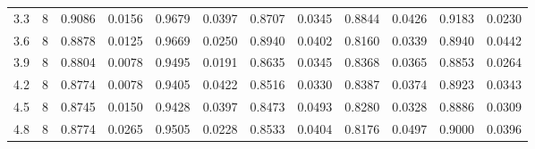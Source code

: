 \begin{tabular}{rrrrrrrrrrrr}
       3.3 &     8 &   0.9086 & 0.0156 &               0.9679 & 0.0397 &                   0.8707 & 0.0345 &               0.8844 & 0.0426 &                       0.9183 & 0.0230 \\
       3.6 &     8 &   0.8878 & 0.0125 &               0.9669 & 0.0250 &                   0.8940 & 0.0402 &               0.8160 & 0.0339 &                       0.8940 & 0.0442 \\
       3.9 &     8 &   0.8804 & 0.0078 &               0.9495 & 0.0191 &                   0.8635 & 0.0345 &               0.8368 & 0.0365 &                       0.8853 & 0.0264 \\
       4.2 &     8 &   0.8774 & 0.0078 &               0.9405 & 0.0422 &                   0.8516 & 0.0330 &               0.8387 & 0.0374 &                       0.8923 & 0.0343 \\
       4.5 &     8 &   0.8745 & 0.0150 &               0.9428 & 0.0397 &                   0.8473 & 0.0493 &               0.8280 & 0.0328 &                       0.8886 & 0.0309 \\
       4.8 &     8 &   0.8774 & 0.0265 &               0.9505 & 0.0228 &                   0.8533 & 0.0404 &               0.8176 & 0.0497 &                       0.9000 & 0.0396 \\
\bottomrule
\end{tabular}
